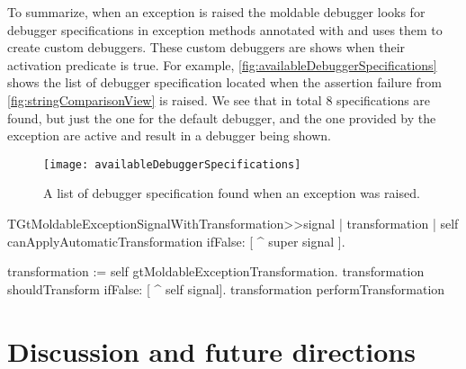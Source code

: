 \documentclass[sigplan,anonymous,review,10pt]{acmart}
\begin{document}
To summarize, when an exception is raised the moldable debugger looks for debugger specifications in exception methods annotated with   and uses them to create custom debuggers. 
These custom debuggers are shows when their activation predicate is true. For example, \autoref{fig:availableDebuggerSpecifications} shows the list of debugger specification located when the assertion failure from \autoref{fig:stringComparisonView} is raised. We see that in total 8 specifications are found, but just the one for the default debugger, and the one provided by the exception are active and result in a debugger being shown.

\begin{figure}[h]
  \texttt{[image: availableDebuggerSpecifications]}
  \caption{A list of debugger specification found when an exception was raised.}
  \label{fig:availableDebuggerSpecifications}
\end{figure}


\begin{code}
TGtMoldableExceptionSignalWithTransformation>>signal
	| transformation |
	self canApplyAutomaticTransformation ifFalse: [ 
		^ super signal ].
	
	transformation := self gtMoldableExceptionTransformation.
	transformation shouldTransform ifFalse: [ ^ self signal].
	transformation performTransformation
\end{code}

\section{Discussion and future directions}\label{sec:directions}
\end{document}
